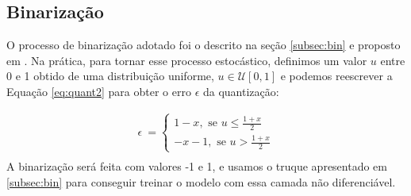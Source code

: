 \subsection{Binarização}

O processo de binarização adotado foi o descrito na seção \ref{subsec:bin} e proposto em \cite{Variable2016Toderici}.
Na prática, para tornar esse processo estocástico,  definimos um valor $u$ entre 0 e 1 obtido de uma distribuição uniforme,  $u \in \mathcal{U}[0,1]$ e podemos reescrever a Equação \ref{eq:quant2}  para obter o erro $\epsilon$ da quantização:

\begin{equation}
\label{eq:quant}
\begin{aligned}
\epsilon \ = \left\{
\begin{array}{ll}
1 - x, \text{ se $u$}  \leq \frac{1 + x}{2} \\
-x - 1, \text{ se $u$} > \frac{1 + x}{2}
\end{array}
\right. \\
\end{aligned}
\end{equation}
A binarização será feita com valores -1 e 1, e usamos o truque apresentado em \ref{subsec:bin} para conseguir treinar o modelo com essa camada não diferenciável. 









